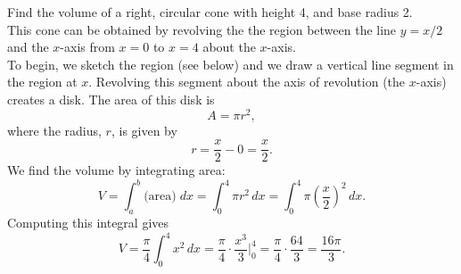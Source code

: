 \documentclass{ximera}
\begin{document}


\begin{example}[example 1]
Find the volume of a right, circular cone with height 4, and base radius 2.\\
This cone can be obtained by revolving the the region between the line $y=x/2$ and the $x$-axis from $x = 0$ to $x = 4$
about the $x$-axis.\\
To begin, we sketch the region (see below) and we draw a vertical line segment in the region at $x$. 
Revolving this segment about the axis of revolution (the $x$-axis) creates a disk.  The area of this disk is
\[
A = \pi r^2,
\]
where the radius, $r$, is given by
\[
r = \frac{x}{2} - 0 = \frac{x}{2}.
\]
We find the volume by integrating area:
\[
V = \int_a^b \text{(area)} \; dx = \int_0^4 \pi r^2 \, dx = \int_0^4 \pi \left(\frac{x}{2}\right)^2 \, dx.
\]
Computing this integral gives
\[
V = \frac{\pi}{4} \int_0^4 x^2 \, dx = \frac{\pi}{4} \cdot \frac{x^3}{3} \bigg |_0^4 = \frac{\pi}{4}\cdot \frac{64}{3} = \frac{16\pi}{3}.
\]


\begin{image}
\end{image}

\end{example}
\end{document}
